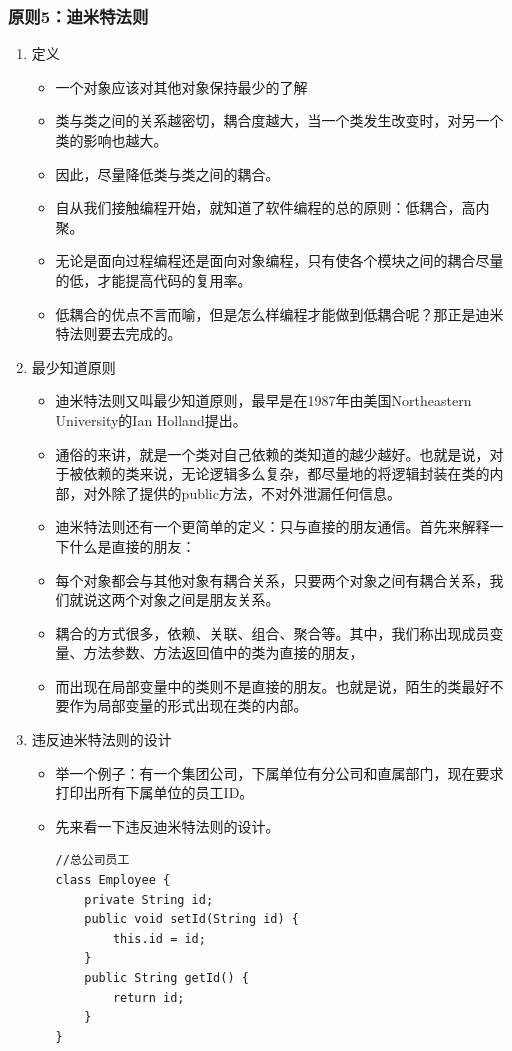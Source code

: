 \documentclass[9pt, b5paper]{article}
\begin{document}
\subsubsection{原则5：迪米特法则}
\label{sec:orgd5ab4d0}
\begin{enumerate}
\item 定义
\label{sec:orga2f5b92}
\begin{itemize}
\item 一个对象应该对其他对象保持最少的了解
\item 类与类之间的关系越密切，耦合度越大，当一个类发生改变时，对另一个类的影响也越大。
\item 因此，尽量降低类与类之间的耦合。
\item 自从我们接触编程开始，就知道了软件编程的总的原则：低耦合，高内聚。
\item 无论是面向过程编程还是面向对象编程，只有使各个模块之间的耦合尽量的低，才能提高代码的复用率。
\item 低耦合的优点不言而喻，但是怎么样编程才能做到低耦合呢？那正是迪米特法则要去完成的。
\end{itemize}
\item 最少知道原则
\label{sec:org2ca0fdc}
\begin{itemize}
\item 迪米特法则又叫最少知道原则，最早是在1987年由美国Northeastern University的Ian Holland提出。
\item 通俗的来讲，就是一个类对自己依赖的类知道的越少越好。也就是说，对于被依赖的类来说，无论逻辑多么复杂，都尽量地的将逻辑封装在类的内部，对外除了提供的public方法，不对外泄漏任何信息。
\item 迪米特法则还有一个更简单的定义：只与直接的朋友通信。首先来解释一下什么是直接的朋友：
\item 每个对象都会与其他对象有耦合关系，只要两个对象之间有耦合关系，我们就说这两个对象之间是朋友关系。
\item 耦合的方式很多，依赖、关联、组合、聚合等。其中，我们称出现成员变量、方法参数、方法返回值中的类为直接的朋友，
\item 而出现在局部变量中的类则不是直接的朋友。也就是说，陌生的类最好不要作为局部变量的形式出现在类的内部。
\end{itemize}
\item 违反迪米特法则的设计
\label{sec:org354aa02}
\begin{itemize}
\item 举一个例子：有一个集团公司，下属单位有分公司和直属部门，现在要求打印出所有下属单位的员工ID。
\item 先来看一下违反迪米特法则的设计。
\begin{verbatim}
//总公司员工
class Employee {
    private String id;
    public void setId(String id) {
        this.id = id;
    }
    public String getId() {
        return id;
    }
}


\end{verbatim}
\end{itemize}
\end{enumerate}
\end{document}
